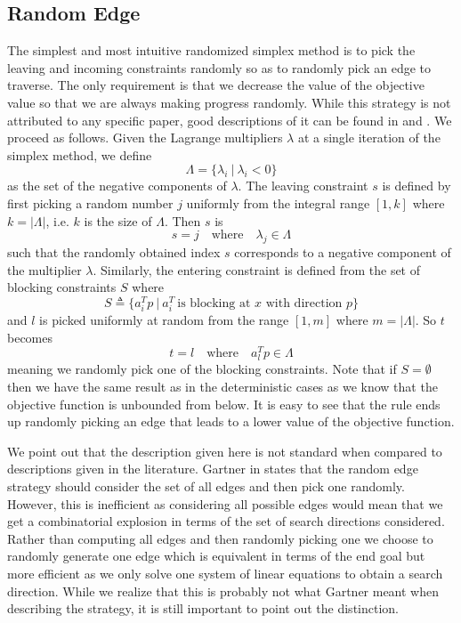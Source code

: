 \documentclass{standalone}
\begin{document}
\subsection{Random Edge}
\label{sec:pivot:randome}
{
  The simplest and most intuitive randomized simplex method is to pick the leaving and incoming constraints randomly so as to randomly pick an edge to traverse. The only requirement is that we decrease the value of the objective value so that we are always making progress randomly. While this strategy is not attributed to any specific paper, good descriptions of it can be found in \cite{gartner1995randomized} and \cite{gartner1998randomized}. We proceed as follows. Given the Lagrange multipliers $\lambda$ at a single iteration of the simplex method, we define
  \[
    \Lambda=\{\lambda_{i}\:|\:\lambda_{i}<0\}
  \]
  as the set of the negative components of $\lambda$. The leaving constraint $s$ is defined by first picking a random number $j$ uniformly from the integral range $[1,k]$ where $k=\left|\Lambda\right|$, i.e. $k$ is the size of $\Lambda$. Then $s$ is
  \[
    s = j\quad\text{where}\quad \lambda_{j}\in\Lambda
  \]
  such that the randomly obtained index $s$ corresponds to a negative component of the multiplier $\lambda$. Similarly, the entering constraint is defined from the set of blocking constraints $S$ where
  \[
    S\triangleq\{a_{i}^{T}p\:|\:a_{i}^{T}\:\text{is blocking at $x$ with direction $p$}\}
  \]
  and $l$ is picked uniformly at random from the range $[1,m]$ where $m=\left|\Lambda\right|$. So $t$ becomes
  \[
    t = l\quad\text{where}\quad a_{l}^{T}p\in\Lambda
  \]
  meaning we randomly pick one of the blocking constraints. Note that if $S=\emptyset$ then we have the same result as in the deterministic cases as we know that the objective function is unbounded from below. It is easy to see that the rule ends up randomly picking an edge that leads to a lower value of the objective function.\par
  We point out that the description given here is not standard when compared to descriptions given in the literature. Gartner in \cite{gartner1995randomized} states that the random edge strategy should consider the set of all edges and then pick one randomly. However, this is inefficient as considering all possible edges would mean that we get a combinatorial explosion in terms of the set of search directions considered. Rather than computing all edges and then randomly picking one we choose to randomly generate one edge which is equivalent in terms of the end goal but more efficient as we only solve one system of linear equations to obtain a search direction. While we realize that this is probably not what Gartner meant when describing the strategy, it is still important to point out the distinction.\par
}
\end{document}
